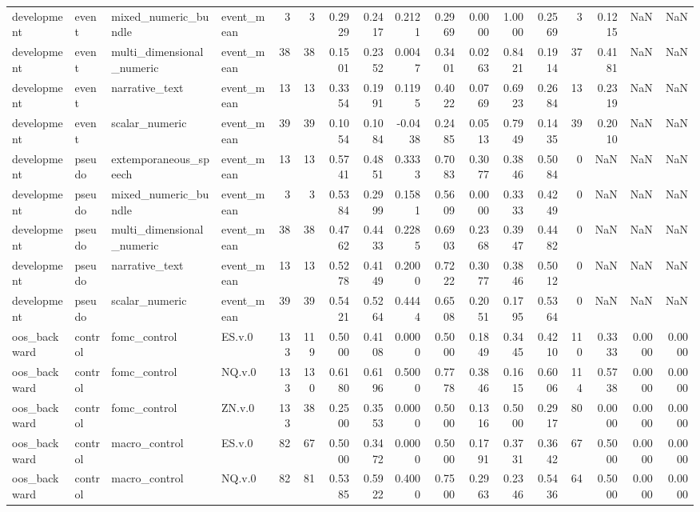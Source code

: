 \begin{tabular}{llllrrrrrrrrrrrrr}
development & event & mixed_numeric_bundle & event_mean & 3 & 3 & 0.2929 & 0.2417 & 0.2121 & 0.2969 & 0.0000 & 1.0000 & 0.2569 & 3 & 0.1215 & NaN & NaN \\
development & event & multi_dimensional_numeric & event_mean & 38 & 38 & 0.1501 & 0.2352 & 0.0047 & 0.3401 & 0.0263 & 0.8421 & 0.1914 & 37 & 0.4181 & NaN & NaN \\
development & event & narrative_text & event_mean & 13 & 13 & 0.3354 & 0.1991 & 0.1195 & 0.4022 & 0.0769 & 0.6923 & 0.2684 & 13 & 0.2319 & NaN & NaN \\
development & event & scalar_numeric & event_mean & 39 & 39 & 0.1054 & 0.1084 & -0.0438 & 0.2485 & 0.0513 & 0.7949 & 0.1435 & 39 & 0.2010 & NaN & NaN \\
development & pseudo & extemporaneous_speech & event_mean & 13 & 13 & 0.5741 & 0.4851 & 0.3333 & 0.7083 & 0.3077 & 0.3846 & 0.5084 & 0 & NaN & NaN & NaN \\
development & pseudo & mixed_numeric_bundle & event_mean & 3 & 3 & 0.5384 & 0.2999 & 0.1581 & 0.5609 & 0.0000 & 0.3333 & 0.4249 & 0 & NaN & NaN & NaN \\
development & pseudo & multi_dimensional_numeric & event_mean & 38 & 38 & 0.4762 & 0.4433 & 0.2285 & 0.6903 & 0.2368 & 0.3947 & 0.4482 & 0 & NaN & NaN & NaN \\
development & pseudo & narrative_text & event_mean & 13 & 13 & 0.5278 & 0.4149 & 0.2000 & 0.7222 & 0.3077 & 0.3846 & 0.5012 & 0 & NaN & NaN & NaN \\
development & pseudo & scalar_numeric & event_mean & 39 & 39 & 0.5421 & 0.5264 & 0.4444 & 0.6508 & 0.2051 & 0.1795 & 0.5364 & 0 & NaN & NaN & NaN \\
oos_backward & control & fomc_control & ES.v.0 & 133 & 119 & 0.5000 & 0.4108 & 0.0000 & 0.5000 & 0.1849 & 0.3445 & 0.4210 & 110 & 0.3333 & 0.0000 & 0.0000 \\
oos_backward & control & fomc_control & NQ.v.0 & 133 & 130 & 0.6180 & 0.6196 & 0.5000 & 0.7778 & 0.3846 & 0.1615 & 0.6006 & 114 & 0.5738 & 0.0000 & 0.0000 \\
oos_backward & control & fomc_control & ZN.v.0 & 133 & 38 & 0.2500 & 0.3553 & 0.0000 & 0.5000 & 0.1316 & 0.5000 & 0.2917 & 80 & 0.0000 & 0.0000 & 0.0000 \\
oos_backward & control & macro_control & ES.v.0 & 82 & 67 & 0.5000 & 0.3472 & 0.0000 & 0.5000 & 0.1791 & 0.3731 & 0.3642 & 67 & 0.5000 & 0.0000 & 0.0000 \\
oos_backward & control & macro_control & NQ.v.0 & 82 & 81 & 0.5385 & 0.5922 & 0.4000 & 0.7500 & 0.2963 & 0.2346 & 0.5436 & 64 & 0.5000 & 0.0000 & 0.0000 \\

\end{tabular}
